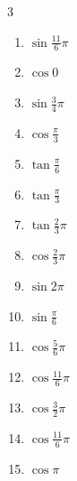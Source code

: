 \begin{multicols}{3}
\begin{enumerate}
  \item $\displaystyle \sin{\frac{11}{6}\pi}$

\columnbreak %

\resetques

  \item $\displaystyle \cos{0}$
        \phantom{$\displaystyle =1$}

  \item $\displaystyle \sin{\frac{3}{4}\pi}$

  \item $\displaystyle \cos{\frac{\pi}{3}}$

  \item $\displaystyle \tan{\frac{\pi}{6}}$

  \item $\displaystyle \tan{\frac{\pi}{3}}$

  \item $\displaystyle \tan{\frac{2}{3}\pi}$

  \item $\displaystyle \cos{\frac{2}{3}\pi}$

  \item $\displaystyle \sin{2\pi}$
        \phantom{$\displaystyle =0$}

  \item $\displaystyle \sin{\frac{\pi}{6}}$

  \item $\displaystyle \cos{\frac{5}{6}\pi}$

  \item $\displaystyle \cos{\frac{11}{6}\pi}$

  \item $\displaystyle \cos{\frac{3}{2}\pi}$
        \phantom{$\displaystyle =0$}

  \item $\displaystyle \cos{\frac{11}{6}\pi}$

  \item $\displaystyle \cos{\pi}$
        \phantom{$\displaystyle =-1$}


\end{enumerate}
\end{multicols}
